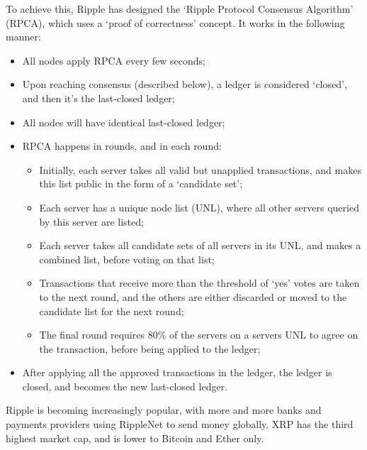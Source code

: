 To achieve this, Ripple has designed the ‘Ripple Protocol Consensus Algorithm’ (RPCA), which uses a ‘proof of correctness’ concept. It works in the following manner:

\begin{itemize}
    \item All nodes apply RPCA every few seconds;
    \item Upon reaching consensus (described below), a ledger is considered ‘closed’, and then it’s the last-closed ledger;
    \item All nodes will have identical last-closed ledger;
    \item RPCA happens in rounds, and in each round:
    \begin{itemize}
        \item Initially, each server takes all valid but unapplied transactions, and makes this list public in the form of a ‘candidate set’;
        \item Each server has a unique node list (UNL), where all other servers queried by this server are listed;
        \item Each server takes all candidate sets of all servers in its UNL, and makes a combined list, before voting on that list;
        \item Transactions that receive more than the threshold of ‘yes’ votes are taken to the next round, and the others are either discarded or moved to the candidate list for the next round;
        \item The final round requires 80\% of the servers on a servers UNL to agree on the transaction, before being applied to the ledger;
    \end{itemize}
    \item After applying all the approved transactions in the ledger, the ledger is closed, and becomes the new last-closed ledger.
\end{itemize}
Ripple is becoming increasingly popular, with more and more banks and payments providers using RippleNet to send money globally. XRP has the third highest market cap, and is lower to Bitcoin and Ether only.

